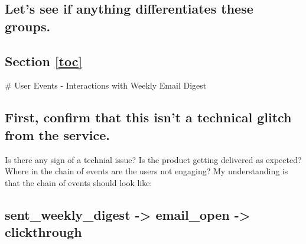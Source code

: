 \documentclass{report}
\begin{document}
\subsection{Let's see if anything differentiates these
groups.}\label{lets-see-if-anything-differentiates-these-groups.}

\subsection{\texorpdfstring{Section \ref{toc}}{}}\label{back-to-table-of-contents}

 \# User Events - Interactions with Weekly Email Digest

\subsection{First, confirm that this isn't a technical glitch from the
service.}\label{first-confirm-that-this-isnt-a-technical-glitch-from-the-service.}

Is there any sign of a technial issue? Is the product getting delivered
as expected? Where in the chain of events are the users not engaging? My
understanding is that the chain of events should look like:

\subsection{sent\_weekly\_digest -\textgreater{} email\_open
-\textgreater{}
clickthrough}\label{sent_weekly_digest---email_open---clickthrough}
\end{document}
